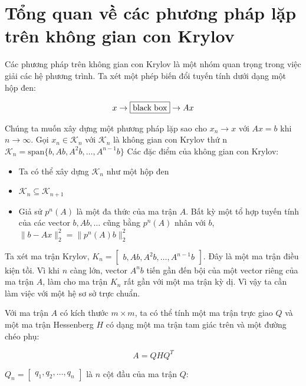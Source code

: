 \documentclass[14pt, a4paper]{article}
\numberwithin{equation}{section}
\numberwithin{algorithm}{section}
\numberwithin{figure}{section}
\numberwithin{dl}{section}
\numberwithin{md}{section}
\numberwithin{bd}{section}
\numberwithin{dn}{section}
\begin{document}
\section{Tổng quan về các phương pháp lặp trên không gian con Krylov}

Các phương pháp trên không gian con Krylov là một nhóm quan trọng trong việc giải các hệ phương trình. Ta xét một phép biến đổi tuyến tính dưới dạng một hộp đen:

\begin{equation}
    x \rightarrow \boxed{\mathrm{black} \thickspace \mathrm{box}} \rightarrow Ax
\end{equation}

Chúng ta muốn xây dựng một phương pháp lặp sao cho $x_n \rightarrow x$ với $Ax=b$ khi $n \rightarrow \infty$. Gọi $x_n \in \mathcal{K}_n$ với $\mathcal{K}_n$ là không gian con Krylov thứ n $\mathcal{K}_n=\mathrm{span} \lbrace b, Ab, A^2b, \dots, A^{n-1}b \rbrace$
Các đặc điểm của không gian con Krylov:
\begin{itemize}
    \item Ta có thể xây dựng $\mathcal{K}_n$ như một hộp đen
    \item $\mathcal{K}_n \subseteq \mathcal{K}_{n+1}$
    \item Giả sử $p^n(A)$ là một đa thức của ma trận $A$. Bất kỳ một tổ hợp tuyến tính của các vector $b, Ab, \dots$ cũng bằng $p^n(A)$ nhân với $b$, $\lVert b - Ax \rVert_2^2 = \lVert p^n(A)b \rVert_2^2$
\end{itemize}

Ta xét ma trận Krylov, $K_n = \begin{bmatrix} b, Ab, A^2b, \dots, A^{n-1}b \end{bmatrix}$. Đây là một ma trận điều kiện tồi. Vì khi $n$ càng lớn, vector $A^nb$ tiến gần đến bội của một vector riêng của ma trận $A$, làm cho ma trận $K_n$ rất gần với một ma trận kỳ dị. Vì vậy ta cần làm việc với một hệ sơ sở trực chuẩn.

Với ma trận $A$ có kích thước $m \times m$, ta có thể tính một ma trận trực giao $Q$ và một ma trận Hessenberg $H$ có dạng một ma trận tam giác trên và một đường chéo phụ:

\begin{equation} \label{eq:AQHQ}
    A = QHQ^T
\end{equation}

$Q_n=\begin{bmatrix} q_1, q_2, \dots, q_n \end{bmatrix}$ là $n$ cột đầu của ma trận $Q$:
\end{document}

